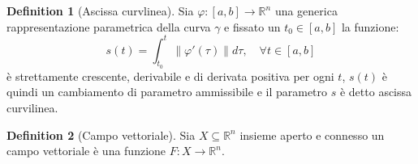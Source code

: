 \documentclass[leqno]{article}
\theoremstyle{definition}
\newtheorem{definition}{Definition}[section]
\numberwithin{equation}{section}
\theoremstyle{remark}
\begin{document}
	\begin{definition}[Ascissa curvlinea]
		Sia $\varphi :[a,b]\to \mathbb{R}^n$ una generica rappresentazione parametrica della curva $\gamma$ e fissato un $t_0\in[a,b]$ la funzione: 
		\begin{equation}
			s(t)=\int_{t_0}^t\lVert \varphi'(\tau)\rVert d\tau, \quad \forall t \in [a,b]
		\end{equation}
		è strettamente crescente, derivabile e di derivata positiva per ogni $t$, $s(t)$ è quindi un cambiamento di parametro ammissibile e il parametro $s$ è detto ascissa curvilinea. 
	\end{definition}
	
	\begin{definition}[Campo vettoriale]
		Sia $X \subseteq \mathbb{R}^n$ insieme aperto e connesso un campo vettoriale è una funzione $F:X \to \mathbb{R}^n$.
	\end{definition}
	
\end{document}
